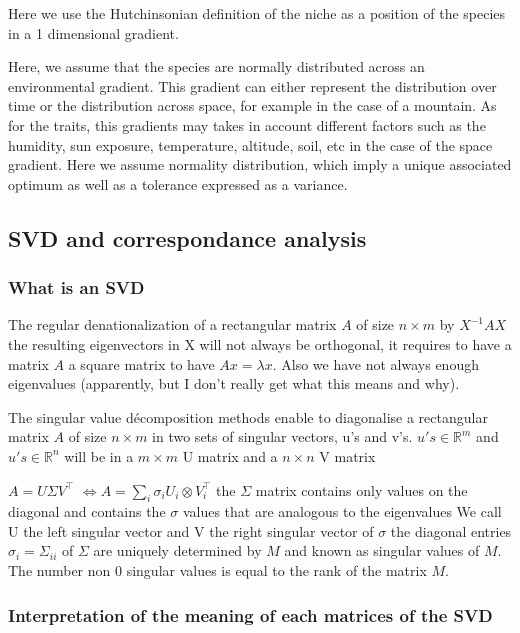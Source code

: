 \documentclass{article}
\begin{document}
Here we use the Hutchinsonian definition of the niche as a position of the species in a 1 dimensional gradient.

Here, we assume that the species are normally distributed across an environmental gradient. This gradient can either represent the distribution over time or the distribution across space, for example in the case of a mountain. As for the traits, this gradients may takes in account different factors such as the humidity, sun exposure, temperature, altitude, soil, etc in the case of the space gradient.
Here we assume normality distribution, which imply a unique associated optimum as well as a tolerance expressed as a variance.




\subsection{SVD and correspondance analysis}

\subsubsection{What is an SVD}

The regular denationalization of a rectangular matrix $A$ of size $n \times m$ by $X^{-1} AX$ the resulting eigenvectors in X will not always be orthogonal, it requires to have a matrix $A$ a square matrix to have $Ax = \lambda x$. Also we have not always enough eigenvalues (apparently, but I don't really get what this means and why).

The singular value décomposition methods enable to diagonalise a rectangular matrix $A$ of size $n \times m$ in two sets of singular vectors, u's and v's. 
$u's \in \mathbb{R}^m$ and $u's \in \mathbb{R}^n$ will be in a $m \times m$ U matrix and a $n \times n$ V matrix

$A = U \Sigma V^\intercal$
$\Leftrightarrow A = \sum_i \sigma_i U_i \otimes V_i^\intercal$
the  $\Sigma$ matrix contains only values on the diagonal and contains the $\sigma$ values that are analogous to the eigenvalues 
We call U the left singular vector and V the right singular vector of $\sigma$
the diagonal entries $\sigma_i = \Sigma_{ii}$ of $\Sigma$ are uniquely determined by $M$ and known as singular values of $M$. The number non 0 singular values is equal to the rank of the matrix $M$.

\subsubsection{Interpretation of the meaning of each matrices of the SVD}
\end{document}
